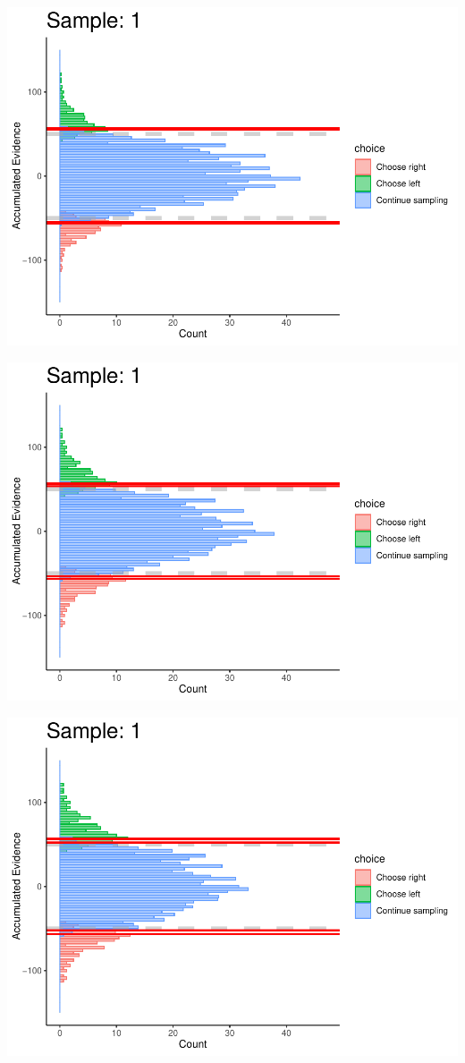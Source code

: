 \documentclass[
]{book}
\begin{document}
\begin{center}\includegraphics[width=0.8\linewidth]{LateNightBayes_files/figure-latex/fixed_dcb-7} \end{center}

\begin{center}\includegraphics[width=0.8\linewidth]{LateNightBayes_files/figure-latex/fixed_dcb-8} \end{center}

\begin{center}\includegraphics[width=0.8\linewidth]{LateNightBayes_files/figure-latex/fixed_dcb-9} \end{center}
\end{document}
